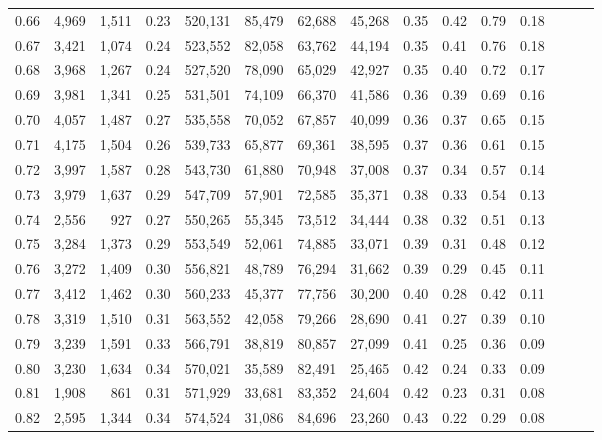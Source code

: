 \begin{tabular}{rrrrrrrrrrrrrrr}
0.66 &   4,969 &  1,511 &  0.23 &  520,131 &   85,479 &   62,688 &   45,268 &  0.35 &  0.42 &  0.79 &      0.18 \\
0.67 &   3,421 &  1,074 &  0.24 &  523,552 &   82,058 &   63,762 &   44,194 &  0.35 &  0.41 &  0.76 &      0.18 \\
0.68 &   3,968 &  1,267 &  0.24 &  527,520 &   78,090 &   65,029 &   42,927 &  0.35 &  0.40 &  0.72 &      0.17 \\
0.69 &   3,981 &  1,341 &  0.25 &  531,501 &   74,109 &   66,370 &   41,586 &  0.36 &  0.39 &  0.69 &      0.16 \\
0.70 &   4,057 &  1,487 &  0.27 &  535,558 &   70,052 &   67,857 &   40,099 &  0.36 &  0.37 &  0.65 &      0.15 \\
0.71 &   4,175 &  1,504 &  0.26 &  539,733 &   65,877 &   69,361 &   38,595 &  0.37 &  0.36 &  0.61 &      0.15 \\
0.72 &   3,997 &  1,587 &  0.28 &  543,730 &   61,880 &   70,948 &   37,008 &  0.37 &  0.34 &  0.57 &      0.14 \\
0.73 &   3,979 &  1,637 &  0.29 &  547,709 &   57,901 &   72,585 &   35,371 &  0.38 &  0.33 &  0.54 &      0.13 \\
0.74 &   2,556 &    927 &  0.27 &  550,265 &   55,345 &   73,512 &   34,444 &  0.38 &  0.32 &  0.51 &      0.13 \\
0.75 &   3,284 &  1,373 &  0.29 &  553,549 &   52,061 &   74,885 &   33,071 &  0.39 &  0.31 &  0.48 &      0.12 \\
0.76 &   3,272 &  1,409 &  0.30 &  556,821 &   48,789 &   76,294 &   31,662 &  0.39 &  0.29 &  0.45 &      0.11 \\
0.77 &   3,412 &  1,462 &  0.30 &  560,233 &   45,377 &   77,756 &   30,200 &  0.40 &  0.28 &  0.42 &      0.11 \\
0.78 &   3,319 &  1,510 &  0.31 &  563,552 &   42,058 &   79,266 &   28,690 &  0.41 &  0.27 &  0.39 &      0.10 \\
0.79 &   3,239 &  1,591 &  0.33 &  566,791 &   38,819 &   80,857 &   27,099 &  0.41 &  0.25 &  0.36 &      0.09 \\
0.80 &   3,230 &  1,634 &  0.34 &  570,021 &   35,589 &   82,491 &   25,465 &  0.42 &  0.24 &  0.33 &      0.09 \\
0.81 &   1,908 &    861 &  0.31 &  571,929 &   33,681 &   83,352 &   24,604 &  0.42 &  0.23 &  0.31 &      0.08 \\
0.82 &   2,595 &  1,344 &  0.34 &  574,524 &   31,086 &   84,696 &   23,260 &  0.43 &  0.22 &  0.29 &      0.08 \\

\end{tabular}
